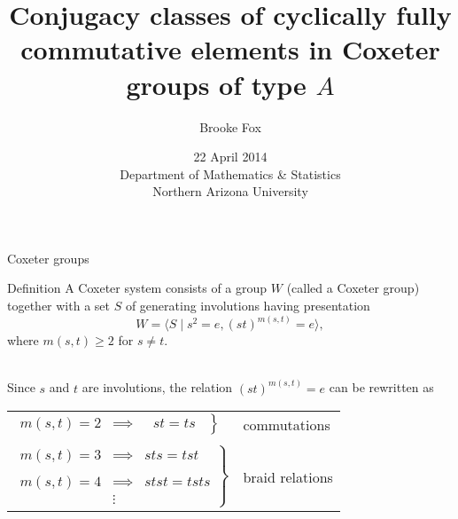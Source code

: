 \documentclass[9pt,handout]{beamer}
\title[]{Conjugacy classes of cyclically fully commutative elements in Coxeter groups of type $A$}
\author[]{Brooke Fox}
\date{
  22 April 2014 \\ 
  Department of Mathematics \& Statistics \\
  Northern Arizona University}
\newcommand{\gen}[1]{\langle #1 \rangle}
\begin{document}
\begin{frame} \maketitle \end{frame}
%    

\begin{frame}{Coxeter groups}
%
\begin{block}{Definition} A \alert{Coxeter system} consists of a group $W$ (called a \alert{Coxeter group}) together with a set $S$ of generating involutions having presentation
    $$W= \gen{S \mid s^2=e,(st)^{m(s,t)}=e},$$
where $m(s,t)\geq 2$ for $s \neq t$.
\end{block} ~\\
    \pause
Since $s$ and $t$ are involutions, the relation $(st)^{m(s,t)}=e$ can be rewritten as
\begin{center}
\begin{tabular}{ll}
$\left.\begin{array}{lcc}m(s,t)=2 & \implies &\ \ \, st=ts\ \
\end{array} \right\}$ & \alert{commutations}\\ \\
$\left.\begin{array}{lcc}m(s,t)=3 & \implies & sts=tst \\ & & \\ m(s,t)=4 & \implies & stst=tsts \\ & \vdots & \end{array} \right\}$ & \alert{braid relations}
\end{tabular}
\end{center}
\end{frame}
\end{document}

